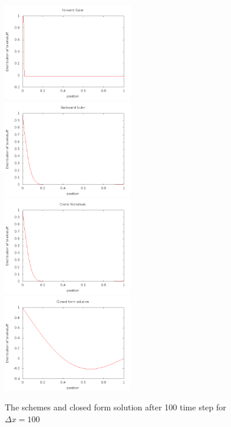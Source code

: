 \documentclass[a4wide,12pt]{article}
\begin{document}
\begin{figure}[hbtp]
	\includegraphics[width=0.5\textwidth]{Forwarddx100100}
	\includegraphics[width=0.5\textwidth]{Backwarddx100100}
	\includegraphics[width=0.5\textwidth]{Crankdx100100}
	\includegraphics[width=0.5\textwidth]{Closedform100100}
	\caption{The schemes and closed form solution after 100 time step for $\Delta x = 100$}
	\label{fig:05}
\end{figure}
\end{document}
